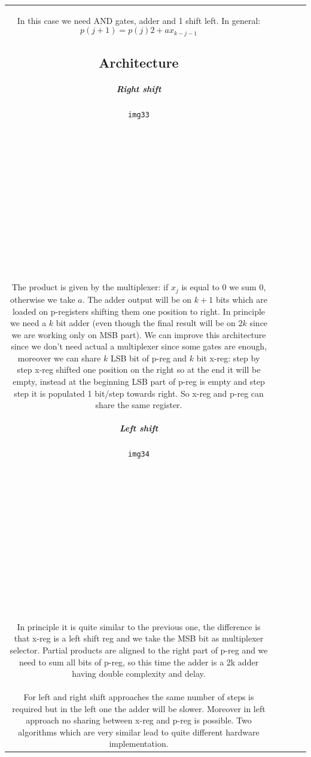 \begin{center}
\begin{tabular}{|c|c|c|c|c|}
In this case we need AND gates, adder and 1 shift left. In general:
$$p(j+1)=p(j)2+ax_{k-j-1}$$

\subsection{Architecture}

\subparagraph{Right shift}

\begin{verbatim}
img33














\end{verbatim}

The product is given by the multiplexer: if $x_j$ is equal to 0 we sum 0, otherwise we take $a$.
The adder output will be on $k+1$ bits which are loaded on p-registers shifting them one position to right. In principle we need a $k$ bit adder (even though the final result will be on $2k$ since we are working only on MSB part). We can improve this architecture since we don't need actual a multiplexer since some gates are enough, moreover we can share $k$ LSB bit of p-reg and $k$ bit x-reg: step by step x-reg shifted one position on the right so at the end it will be empty, instead at the beginning LSB part of p-reg is empty and step step it is populated 1 bit/step towards right. So x-reg and p-reg can share the same register.

\subparagraph{Left shift}
\begin{verbatim}
img34














\end{verbatim}

In principle it is quite similar to the previous one, the difference is that x-reg is a left shift reg and we take the MSB bit as multiplexer selector. Partial products are aligned to the right part of p-reg and we need to sum all bits of p-reg, so this time the adder is a 2k adder having double complexity and delay.\\

For left and right shift approaches the same number of steps is required but in the left one the adder will be slower. Moreover in left approach no sharing between x-reg and p-reg is possible. Two algorithms which are very similar lead to quite different hardware implementation.


\end{tabular}
\end{center}
